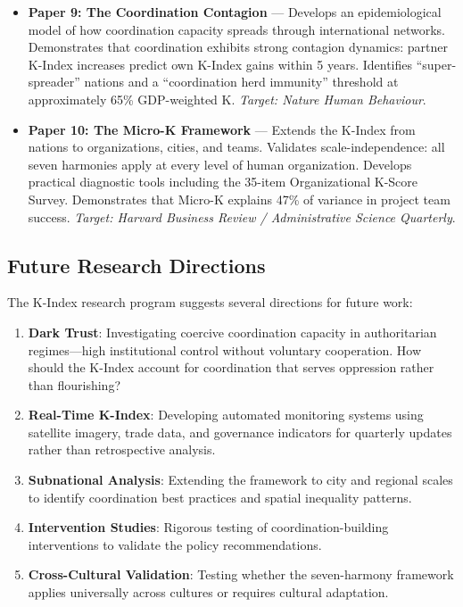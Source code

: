 \documentclass[12pt,letterpaper]{article}
\begin{document}
\begin{itemize}
    \item \textbf{Paper 9: The Coordination Contagion} --- Develops an epidemiological model of how coordination capacity spreads through international networks. Demonstrates that coordination exhibits strong contagion dynamics: partner K-Index increases predict own K-Index gains within 5 years. Identifies ``super-spreader'' nations and a ``coordination herd immunity'' threshold at approximately 65\% GDP-weighted K. \textit{Target: Nature Human Behaviour}.

    \item \textbf{Paper 10: The Micro-K Framework} --- Extends the K-Index from nations to organizations, cities, and teams. Validates scale-independence: all seven harmonies apply at every level of human organization. Develops practical diagnostic tools including the 35-item Organizational K-Score Survey. Demonstrates that Micro-K explains 47\% of variance in project team success. \textit{Target: Harvard Business Review / Administrative Science Quarterly}.
\end{itemize}

\subsection{Future Research Directions}

The K-Index research program suggests several directions for future work:

\begin{enumerate}
    \item \textbf{Dark Trust}: Investigating coercive coordination capacity in authoritarian regimes---high institutional control without voluntary cooperation. How should the K-Index account for coordination that serves oppression rather than flourishing?

    \item \textbf{Real-Time K-Index}: Developing automated monitoring systems using satellite imagery, trade data, and governance indicators for quarterly updates rather than retrospective analysis.

    \item \textbf{Subnational Analysis}: Extending the framework to city and regional scales to identify coordination best practices and spatial inequality patterns.

    \item \textbf{Intervention Studies}: Rigorous testing of coordination-building interventions to validate the policy recommendations.

    \item \textbf{Cross-Cultural Validation}: Testing whether the seven-harmony framework applies universally across cultures or requires cultural adaptation.
\end{enumerate}
\end{document}

